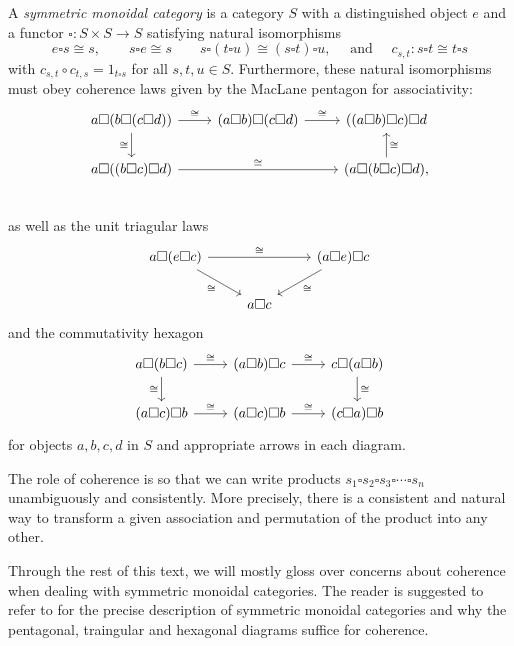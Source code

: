 \begin{definition}
A \emph{symmetric monoidal category} is a category $S$ with a distinguished object $e$
and a functor $\square : S \times S \to S$ satisfying natural isomorphisms
\[
  e \square s \cong s, \qquad s \square e \cong s \qquad 
  s \square (t \square u) \cong (s \square t) \square u,\quad  \text{ and } \quad 
  c_{s,t} : s \square t \cong t \square s
\]
with $c_{s,t} \circ c_{t,s} = 1_{t \square s}$ for all $s,t,u \in S$. 
Furthermore, these natural isomorphisms must obey coherence laws given by the MacLane pentagon for associativity: 
\[
\begin{tikzcd}
a \square (b \square (c \square d)) \arrow[r, "\cong"] \arrow[d, "\cong"'] & (a \square b) \square (c \square d) \arrow[r, "\cong"] & ((a \square b) \square c) \square d \\
a \square ((b \square c) \square d) \arrow[rr, "\cong" ] && (a \square (b \square c) \square d), \arrow[u, "\cong"'] \\
\end{tikzcd}
\]
as well as the unit triagular laws 
\[
\begin{tikzcd}
a \square (e \square c) \arrow[dr, "\cong"'] \arrow[rr, "\cong"] & & (a \square e) \square c \arrow[dl, "\cong"] \\
& a \square c &
\end{tikzcd}
\]
and the commutativity hexagon
\[
\begin{tikzcd}
a \square (b \square c) \arrow[d, "\cong"'] \arrow[r, "\cong"] & (a \square b) \square c \arrow[r, "\cong"] & c \square (a \square b) \arrow[d, "\cong"] \\
(a \square c) \square b \arrow[r, "\cong"] & (a \square c) \square b \arrow[r, "\cong"] & (c \square a) \square b
\end{tikzcd}
\]
for objects $a,b,c,d$ in $S$ and appropriate arrows in each diagram.
\end{definition}

The role of coherence is so that we can write products $s_1 \square s_2 \square s_3 \square \cdots \square s_n$ 
unambiguously and consistently. More precisely, there is a consistent and natural way to transform a given 
association and permutation of the product into any other.

Through the rest of this text, we will mostly gloss over concerns about coherence when dealing with symmetric
monoidal categories.
The reader is suggested to refer to \cite{MacLane63} for the precise description of symmetric monoidal categories
and why the pentagonal, traingular and hexagonal diagrams suffice for coherence.

